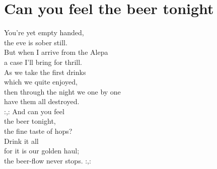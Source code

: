 \section{Can you feel the beer tonight}
You’re yet empty handed,\\
the eve is sober still.\\
But when I arrive from the Alepa\\
a case I’ll bring for thrill.\\
As we take the first drinks\\
which we quite enjoyed,\\
then through the night we one by one\\
have them all destroyed.\\

:,: And can you feel\\
the beer tonight,\\
the fine taste of hops?\\
Drink it all\\
for it is our golden haul;\\
the beer-flow never stops. :,:
